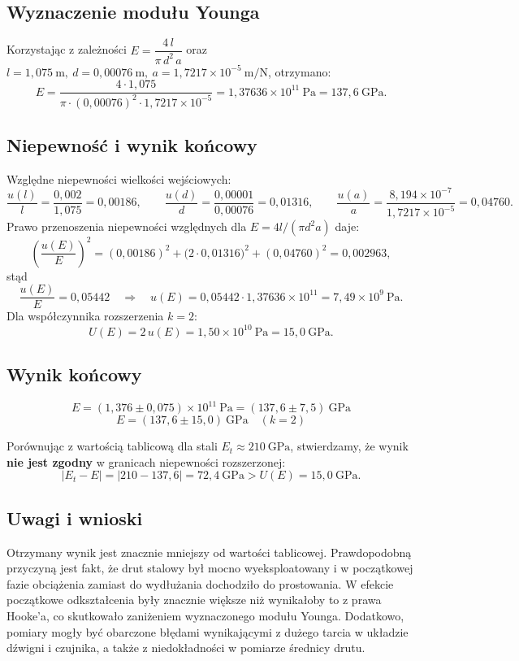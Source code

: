 \documentclass{fizykalab}
\begin{document}
\subsection{Wyznaczenie modułu Younga}

Korzystając z zależności \(E = \dfrac{4\,l}{\pi\,d^{2}\,a}\) oraz
\(l = 1{,}075\ \mathrm{m},\ d=0{,}00076\ \mathrm{m},\
a = 1{,}7217\times 10^{-5}\ \mathrm{m/N}\), otrzymano:
$$
E = \frac{4 \cdot 1{,}075}{\pi \cdot (0{,}00076)^2 \cdot
1{,}7217\times 10^{-5}}
= 1{,}37636\times 10^{11}\ \mathrm{Pa}
= 137{,}6\ \mathrm{GPa}.
$$

\subsection{Niepewność i wynik końcowy}

Względne niepewności wielkości wejściowych:
$$
\frac{u(l)}{l}=\frac{0{,}002}{1{,}075}=0{,}00186,\qquad
\frac{u(d)}{d}=\frac{0{,}00001}{0{,}00076}=0{,}01316,\qquad
\frac{u(a)}{a}=\frac{8{,}194\times10^{-7}}{1{,}7217\times10^{-5}}
=0{,}04760.
$$
Prawo przenoszenia niepewności względnych dla
\(E = 4l/(\pi d^{2}a)\) daje:
$$
\left(\frac{u(E)}{E}\right)^2 =
(0{,}00186)^2 + \bigl(2\cdot 0{,}01316\bigr)^2 + (0{,}04760)^2
= 0{,}002963,
$$
stąd
$$
\frac{u(E)}{E} = 0{,}05442
\quad\Rightarrow\quad
u(E) = 0{,}05442 \cdot 1{,}37636\times10^{11}
= 7{,}49\times10^{9}\ \mathrm{Pa}.
$$
Dla współczynnika rozszerzenia \(k=2\):
$$
U(E) = 2\,u(E) = 1{,}50\times10^{10}\ \mathrm{Pa} = 15{,}0\ \mathrm{GPa}.
$$

\subsection*{Wynik końcowy}
$$
\boxed{E = (1{,}376 \pm 0{,}075)\times 10^{11}\ \mathrm{Pa}
= (137{,}6 \pm 7{,}5)\ \mathrm{GPa}}
$$
$$
\boxed{E = (137{,}6 \pm 15{,}0)\ \mathrm{GPa}\quad (k=2)}
$$

Porównując z wartością tablicową dla stali \(E_t \approx 210\ \mathrm{GPa}\),
stwierdzamy, że wynik \textbf{nie jest zgodny} w granicach niepewności rozszerzonej:
$$
|E_t - E| = |210 - 137{,}6| = 72{,}4\ \mathrm{GPa} > U(E) = 15{,}0\ \mathrm{GPa}.
$$

\subsection{Uwagi i wnioski}

Otrzymany wynik jest znacznie mniejszy od wartości tablicowej.
Prawdopodobną przyczyną jest fakt, że drut stalowy był mocno
wyeksploatowany i w początkowej fazie obciążenia zamiast do wydłużania
dochodziło do prostowania. W efekcie początkowe odkształcenia były
znacznie większe niż wynikałoby to z prawa Hooke'a, co skutkowało
zaniżeniem wyznaczonego modułu Younga. Dodatkowo, pomiary
mogły być obarczone błędami wynikającymi z dużego tarcia w układzie
dźwigni i czujnika, a także z niedokładności w pomiarze średnicy drutu.
\end{document}
